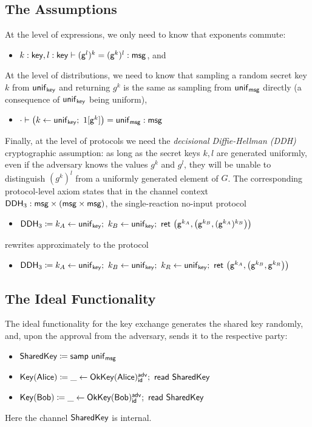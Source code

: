 \subsection{The Assumptions}
At the level of expressions, we only need to know that exponents commute:
\begin{itemize}
\item $k : \mathsf{key}, l : \mathsf{key} \vdash (\mathsf{g}^l)^k = (\mathsf{g}^k)^l : \mathsf{msg}$, and
\end{itemize}
At the level of distributions, we need to know that sampling a random secret key $k$ from $\mathsf{unif}_{\mathsf{key}}$ and returning $g^k$ is the same as sampling from $\mathsf{unif}_{\mathsf{msg}}$ directly (a consequence of $\mathsf{unif}_{\mathsf{key}}$ being uniform),
\begin{itemize}
\item $\cdot \vdash \big(k \leftarrow \mathsf{unif}_{\mathsf{key}}; \ 1[\mathsf{g}^k]\big) = \mathsf{unif}_{\mathsf{msg}} : \mathsf{msg}$
\end{itemize}
Finally, at the level of protocols we need the \emph{decisional Diffie-Hellman (DDH)} cryptographic assumption: as long as the secret keys $k,l$ are generated uniformly, even if the adversary knows the values $g^k$ and $g^l$, they will be unable to distinguish $(g^k)^l$ from a uniformly generated element of $G$. The corresponding protocol-level axiom states that in the channel context $\mathsf{DDH}_3 : \mathsf{msg} \times (\mathsf{msg} \times \mathsf{msg})$, the single-reaction no-input protocol
\begin{itemize}
\item $\mathsf{DDH}_3 \coloneqq k_A \leftarrow \mathsf{unif}_{\mathsf{key}}; \ k_B \leftarrow \mathsf{unif}_{\mathsf{key}}; \ \mathsf{ret} \ \big(\mathsf{g}^{k_A}, \big(\mathsf{g}^{k_B}, (\mathsf{g}^{k_A})^{k_B}\big)\big)$
\end{itemize}
rewrites approximately to the protocol
\begin{itemize}
\item $\DDH_3 \coloneqq k_A \leftarrow \unif_\key; \ k_B \leftarrow \unif_\key; \ k_R \leftarrow \unif_\key; \ \ret{\big(\gen^{k_A}, \big(\gen^{k_B}, \gen^{k_R}\big)\big)}$
\end{itemize}

\subsection{The Ideal Functionality}
The ideal functionality for the key exchange generates the shared key randomly, and, upon the approval from the adversary, sends it to the respective party:
\begin{itemize}
\item $\mathsf{SharedKey} \coloneqq \mathsf{samp} \ \mathsf{unif}_{\mathsf{msg}}$
\item $\mathsf{Key}(\mathsf{Alice}) \coloneqq \_ \leftarrow \mathsf{OkKey}(\mathsf{Alice})^{\mathsf{adv}}_{\mathsf{id}}; \ \mathsf{read} \ \mathsf{SharedKey}$
\item $\mathsf{Key}(\mathsf{Bob}) \coloneqq \_ \leftarrow \mathsf{OkKey}(\mathsf{Bob})^{\mathsf{adv}}_{\mathsf{id}}; \ \mathsf{read} \ \mathsf{SharedKey}$
\end{itemize}
Here the channel $\mathsf{SharedKey}$ is internal.

